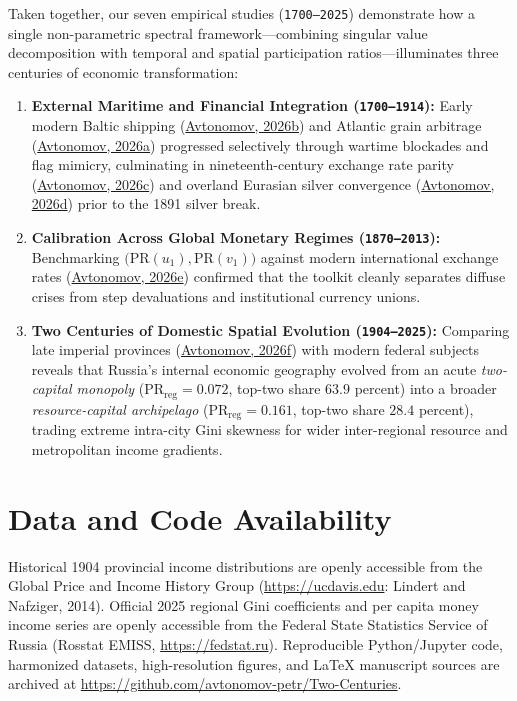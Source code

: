 \documentclass[11pt,a4paper]{article}
\begin{document}
Taken together, our seven empirical studies (\texttt{1700--2025}) demonstrate how a single non-parametric spectral framework—combining singular value decomposition with temporal and spatial participation ratios—illuminates three centuries of economic transformation:
\begin{enumerate}
    \item \textbf{External Maritime and Financial Integration (\texttt{1700--1914}):} Early modern Baltic shipping (\href{https://doi.org}{Avtonomov, 2026b}) and Atlantic grain arbitrage (\href{https://doi.org}{Avtonomov, 2026a}) progressed selectively through wartime blockades and flag mimicry, culminating in nineteenth-century exchange rate parity (\href{https://doi.org}{Avtonomov, 2026c}) and overland Eurasian silver convergence (\href{https://doi.org}{Avtonomov, 2026d}) prior to the 1891 silver break.
    \item \textbf{Calibration Across Global Monetary Regimes (\texttt{1870--2013}):} Benchmarking $\big(\mathrm{PR}(u_1), \mathrm{PR}(v_1)\big)$ against modern international exchange rates (\href{https://doi.org}{Avtonomov, 2026e}) confirmed that the toolkit cleanly separates diffuse crises from step devaluations and institutional currency unions.
    \item \textbf{Two Centuries of Domestic Spatial Evolution (\texttt{1904--2025}):} Comparing late imperial provinces (\href{https://doi.org}{Avtonomov, 2026f}) with modern federal subjects reveals that Russia's internal economic geography evolved from an acute \emph{two-capital monopoly} ($\mathrm{PR}_{\mathrm{reg}} = 0.072$, top-two share $63.9$ percent) into a broader \emph{resource-capital archipelago} ($\mathrm{PR}_{\mathrm{reg}} = 0.161$, top-two share $28.4$ percent), trading extreme intra-city Gini skewness for wider inter-regional resource and metropolitan income gradients.
\end{enumerate}

\section*{Data and Code Availability}
Historical 1904 provincial income distributions are openly accessible from the Global Price and Income History Group (\url{https://ucdavis.edu}: Lindert and Nafziger, 2014). Official 2025 regional Gini coefficients and per capita money income series are openly accessible from the Federal State Statistics Service of Russia (Rosstat EMISS, \url{https://fedstat.ru}). Reproducible Python/Jupyter code, harmonized datasets, high-resolution figures, and LaTeX manuscript sources are archived at \url{https://github.com/avtonomov-petr/Two-Centuries}.
\end{document}
